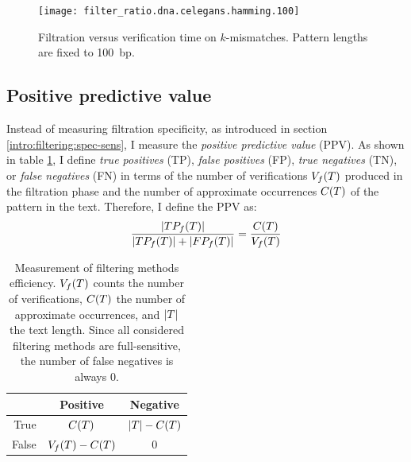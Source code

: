 \begin{figure}[b]
\begin{center}
\caption[Filtration versus verification time on $k$-mismatches]{Filtration versus verification time on $k$-mismatches. Pattern lengths are fixed to 100~bp.}
\label{fig:filter-ratio-hamming-celegans}
\texttt{[image: filter\_ratio.dna.celegans.hamming.100]}
\end{center}
\end{figure}


\subsection{Positive predictive value}

Instead of measuring filtration specificity, as introduced in section \ref{intro:filtering:spec-sens}, I measure the \emph{positive predictive value} (PPV).
As shown in table \ref{tab:filter:ppv}, I define \emph{true positives} (TP), \emph{false positives} (FP), \emph{true negatives} (TN), or \emph{false negatives} (FN) in terms of the number of verifications $V_f(T)$ produced in the filtration phase and the number of approximate occurrences $C(T)$ of the pattern in the text.
Therefore, I define the PPV as:
\begin{eqnarray}
\frac{|TP_f(T)|}{|TP_f(T)| + |FP_f(T)|} = \frac{C(T)}{V_f(T)}
\end{eqnarray}

\begin{table}[t]
\begin{center}
\caption[Measurement of filtering methods efficiency]{Measurement of filtering methods efficiency. $V_f(T)$ counts the number of verifications, $C(T)$ the number of approximate occurrences, and $|T|$ the text length. Since all considered filtering methods are full-sensitive, the number of false negatives is always 0.}
\begin{tabular}{rcc}
\toprule
  & Positive & Negative\\
\midrule
True & $C(T)$ & $|T| - C(T)$ \\
False & $V_f(T) - C(T)$ & 0		\\
\bottomrule
\end{tabular}
\label{tab:filter:ppv}
\end{center}
\end{table}

